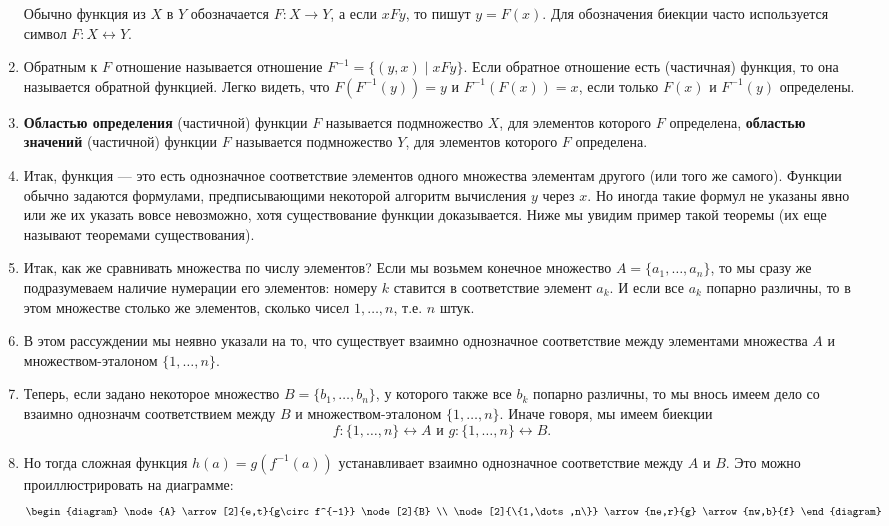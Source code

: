 \begin{enumerate}
Обычно функция из $X$ в $Y$ обозначается $F:X\to Y$, а если $xFy$, то пишут $y=F(x)$. Для обозначения биекции часто используется символ $F:X\leftrightarrow Y$.
\item Обратным к $F$ отношение называется отношение $F^{-1}=\{(y,x)\mid xFy\}$. Если обратное отношение есть (частичная) функция, то она называется обратной функцией. Легко видеть, что $F(F^{-1}(y))=y$ и $F^{-1}(F(x))=x$, если только $F(x)$ и $F^{-1}(y)$ определены.
\item \textbf{Областью определения} (частичной) функции $F$ называется подмножество $X$, для элементов которого $F$ определена, \textbf{областью значений} (частичной) функции $F$ называется подмножество $Y$, для элементов которого $F$ определена.
\item Итак, функция --- это есть однозначное соответствие элементов одного множества элементам другого (или того же самого). Функции обычно задаются формулами, предписывающими некоторой алгоритм вычисления $y$ через $x$. Но иногда такие формул не указаны явно или же их указать вовсе невозможно, хотя существование функции доказывается. Ниже мы увидим пример такой теоремы (их еще называют теоремами существования).
\item Итак, как же сравнивать множества по числу элементов? Если мы возьмем конечное множество $A=\{a_1,\dots,a_n\}$, то мы сразу же подразумеваем наличие нумерации его элементов: номеру $k$ ставится в соответствие элемент $a_k$. И если все $a_k$ попарно различны, то в этом множестве столько же элементов, сколько чисел $1,\dots,n$, т.е. $n$ штук.
\item В этом рассуждении мы неявно указали на то, что существует взаимно однозначное соответствие между элементами множества $A$ и множеством-эталоном $\{1,\dots, n\}$.
\item Теперь, если задано некоторое множество $B=\{b_1,\dots,b_n\}$, у которого также все $b_k$ попарно различны, то мы внось имеем дело со взаимно однозначм соответствием между $B$ и множеством-эталоном $\{1,\dots, n\}$. Иначе говоря, мы имеем биекции 
$$
f:\{1,\dots, n\}\leftrightarrow A\mbox{ и }g:\{1,\dots, n\}\leftrightarrow B.
$$
\item Но тогда сложная функция $h(a)=g(f^{-1}(a))$ устанавливает взаимно однозначное соответствие между $A$ и $B$. Это можно проиллюстрировать на диаграмме:
\[ \begin{diagram}
\node{A} \arrow[2]{e,t}{g\circ f^{-1}}
\node[2]{B} \\
\node[2]{\{1,\dots,n\}} \arrow{ne,r}{g}
\arrow{nw,b}{f}
\end{diagram}\]


\end{enumerate}
